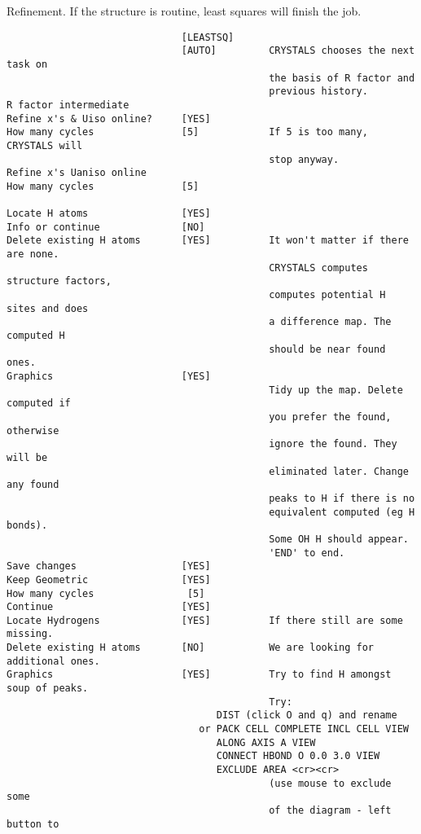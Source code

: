 \documentclass[10pt,a4paper]{report}
\begin{document}
Refinement. If the structure is routine, least squares will finish the job.
\small\begin{verbatim}
                              [LEASTSQ]
                              [AUTO]         CRYSTALS chooses the next task on
                                             the basis of R factor and
                                             previous history.
R factor intermediate
Refine x's & Uiso online?     [YES]
How many cycles               [5]            If 5 is too many, CRYSTALS will
                                             stop anyway.
Refine x's Uaniso online
How many cycles               [5]

Locate H atoms                [YES]
Info or continue              [NO]
Delete existing H atoms       [YES]          It won't matter if there are none.
                                             CRYSTALS computes structure factors,
                                             computes potential H sites and does
                                             a difference map. The computed H
                                             should be near found ones.
Graphics                      [YES]
                                             Tidy up the map. Delete computed if
                                             you prefer the found, otherwise
                                             ignore the found. They will be
                                             eliminated later. Change any found
                                             peaks to H if there is no
                                             equivalent computed (eg H bonds).
                                             Some OH H should appear.
                                             'END' to end.
Save changes                  [YES]
Keep Geometric                [YES]
How many cycles                [5]
Continue                      [YES]
Locate Hydrogens              [YES]          If there still are some missing.
Delete existing H atoms       [NO]           We are looking for additional ones.
Graphics                      [YES]          Try to find H amongst soup of peaks.
                                             Try:
                                    DIST (click O and q) and rename
                                 or PACK CELL COMPLETE INCL CELL VIEW
                                    ALONG AXIS A VIEW
                                    CONNECT HBOND O 0.0 3.0 VIEW
                                    EXCLUDE AREA <cr><cr>
                                             (use mouse to exclude some
                                             of the diagram - left button to

\end{verbatim}
\end{document}
